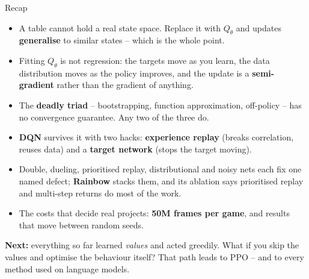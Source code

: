 \documentclass[aspectratio=169]{beamer}
\begin{document}
\begin{frame}{Recap}
  \footnotesize
  \begin{itemize}\itemsep4pt
    \item A table cannot hold a real state space. Replace it with $Q_\theta$ and updates
          \textbf{generalise} to similar states -- which is the whole point.
    \item Fitting $Q_\theta$ is not regression: the targets move as you learn, the data
          distribution moves as the policy improves, and the update is a \textbf{semi-gradient}
          rather than the gradient of anything.
    \item The \textbf{deadly triad} -- bootstrapping, function approximation, off-policy -- has
          no convergence guarantee. Any two of the three do.
    \item \textbf{DQN} survives it with two hacks: \textbf{experience replay} (breaks
          correlation, reuses data) and a \textbf{target network} (stops the target moving).
    \item Double, dueling, prioritised replay, distributional and noisy nets each fix one named
          defect; \textbf{Rainbow} stacks them, and its ablation says prioritised replay and
          multi-step returns do most of the work.
    \item The costs that decide real projects: \textbf{50M frames per game}, and results that
          move between random seeds.
  \end{itemize}

  \vskip 5pt
  \begin{tcolorbox}[colback=paramgreen!8, colframe=paramgreen, boxrule=0.6pt, arc=2pt]
    \footnotesize
    \textbf{Next:} everything so far learned \emph{values} and acted greedily. What if you skip
    the values and optimise the behaviour itself? That path leads to PPO -- and to every method
    used on language models.
  \end{tcolorbox}
\end{frame}
\end{document}
